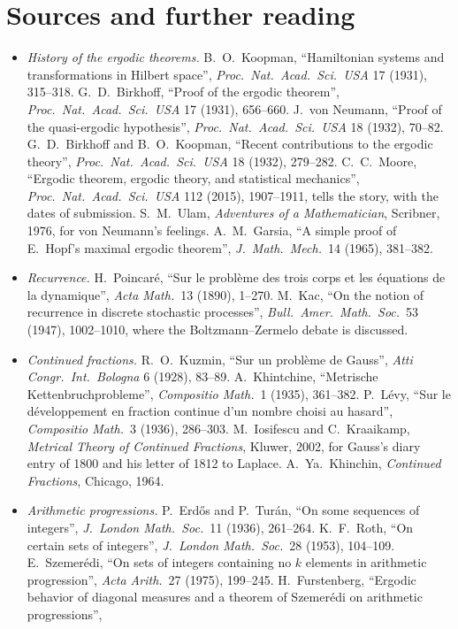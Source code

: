 \section*{Sources and further reading}

\begin{itemize}
\item \emph{History of the ergodic theorems.} B.~O.~Koopman, ``Hamiltonian systems and transformations in Hilbert space'', \emph{Proc.\ Nat.\ Acad.\ Sci.\ USA} 17 (1931), 315--318. G.~D.~Birkhoff, ``Proof of the ergodic theorem'',
\emph{Proc.\ Nat.\ Acad.\ Sci.\ USA} 17 (1931), 656--660. J.~von Neumann, ``Proof of the quasi-ergodic hypothesis'', \emph{Proc.\ Nat.\ Acad.\ Sci.\ USA} 18 (1932), 70--82. G.~D.~Birkhoff and B.~O.~Koopman, ``Recent contributions to the
ergodic theory'', \emph{Proc.\ Nat.\ Acad.\ Sci.\ USA} 18 (1932), 279--282. C.~C.~Moore, ``Ergodic theorem, ergodic theory, and statistical mechanics'', \emph{Proc.\ Nat.\ Acad.\ Sci.\ USA} 112 (2015), 1907--1911, tells the story,
with the dates of submission. S.~M.~Ulam, \emph{Adventures of a Mathematician}, Scribner, 1976, for von Neumann's feelings. A.~M.~Garsia, ``A simple proof of E.~Hopf's maximal ergodic theorem'', \emph{J.\ Math.\ Mech.}\ 14 (1965), 381--382.
\item \emph{Recurrence.} H.~Poincar\'e, ``Sur le probl\`eme des trois corps et les \'equations de la dynamique'', \emph{Acta Math.}\ 13 (1890), 1--270. M.~Kac, ``On the notion of recurrence in discrete stochastic processes'',
\emph{Bull.\ Amer.\ Math.\ Soc.}\ 53 (1947), 1002--1010, where the Boltzmann--Zermelo debate is discussed.
\item \emph{Continued fractions.} R.~O.~Kuzmin, ``Sur un probl\`eme de Gauss'', \emph{Atti Congr.\ Int.\ Bologna} 6 (1928), 83--89. A.~Khintchine, ``Metrische Kettenbruchprobleme'', \emph{Compositio Math.}\ 1 (1935), 361--382. P.~L\'evy, ``Sur le
d\'eveloppement en fraction continue d'un nombre choisi au hasard'', \emph{Compositio Math.}\ 3 (1936), 286--303. M.~Iosifescu and C.~Kraaikamp, \emph{Metrical Theory of Continued Fractions}, Kluwer, 2002, for Gauss's diary entry of 1800 and his
letter of 1812 to Laplace. A.~Ya.~Khinchin, \emph{Continued Fractions}, Chicago, 1964.
\item \emph{Arithmetic progressions.} P.~Erd\H os and P.~Tur\'an, ``On some sequences of integers'', \emph{J.\ London Math.\ Soc.}\ 11 (1936), 261--264. K.~F.~Roth, ``On certain sets of integers'', \emph{J.\ London Math.\ Soc.}\ 28 (1953), 104--109.
E.~Szemer\'edi, ``On sets of integers containing no $k$ elements in arithmetic progression'', \emph{Acta Arith.}\ 27 (1975), 199--245. H.~Furstenberg, ``Ergodic behavior of diagonal measures and a theorem of Szemer\'edi on arithmetic progressions'',

\end{itemize}
